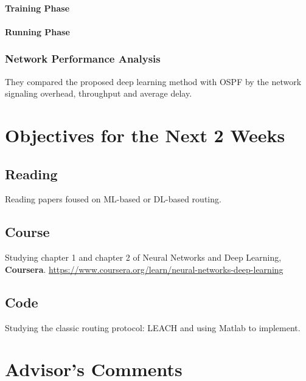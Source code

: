 \documentclass[11pt]{report}
\begin{document}
	\paragraph{Training Phase}
              

	\paragraph{Running Phase}

	
	\subsubsection{Network Performance Analysis}
	They compared the proposed deep learning method with OSPF by the network signaling overhead, throughput and average delay. 
	
	\section{Objectives for the Next 2 Weeks}
	\subsection{Reading} 
	Reading papers foused on ML-based or DL-based routing.
	\subsection{Course} 
	Studying chapter 1 and chapter 2 of Neural Networks and Deep Learning, \textbf{Coursera}. \url{https://www.coursera.org/learn/neural-networks-deep-learning}
	\subsection{Code}
	Studying the classic routing protocol: LEACH and using Matlab to implement.
	
	\section{Advisor's Comments}
	
	
	
	
\end{document}
